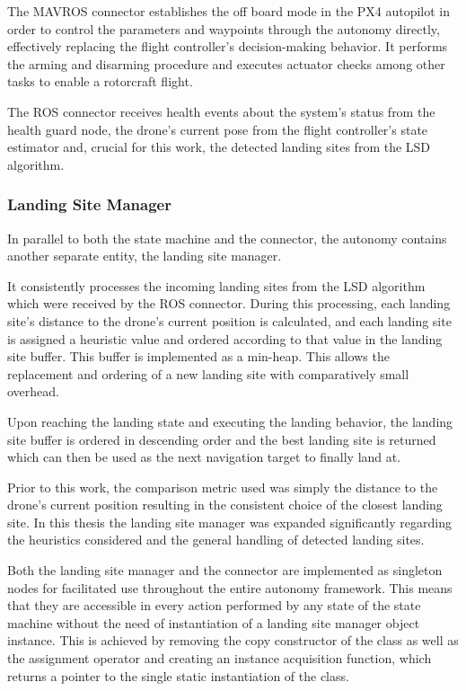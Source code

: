 The MAVROS connector establishes the off board mode in the PX4 autopilot in order to control the parameters and waypoints through the autonomy directly, effectively replacing the flight controller's decision-making behavior. It performs the arming and disarming procedure and executes actuator checks among other tasks to enable a rotorcraft flight.

The ROS connector receives health events about the system's status from the health guard node, the drone's current pose from the flight controller's state estimator and, crucial for this work, the detected landing sites from the LSD algorithm.

\subsubsection{Landing Site Manager}

In parallel to both the state machine and the connector, the autonomy contains another separate entity, the landing site manager. 

It consistently processes the incoming landing sites from the LSD algorithm which were received by the ROS connector. During this processing, each landing site's distance to the drone's current position is calculated, and each landing site is assigned a heuristic value and ordered according to that value in the landing site buffer. This buffer is implemented as a min-heap. This allows the replacement and ordering of a new landing site with comparatively small overhead. 

Upon reaching the landing state and executing the landing behavior, the landing site buffer is ordered in descending order and the best landing site is returned which can then be used as the next navigation target to finally land at.

Prior to this work, the comparison metric used was simply the distance to the drone's current position resulting in the consistent choice of the closest landing site. In this thesis the landing site manager was expanded significantly regarding the heuristics considered and the general handling of detected landing sites. 

Both the landing site manager and the connector are implemented as singleton nodes for facilitated use throughout the entire autonomy framework. This means that they are accessible in every action performed by any state of the state machine without the need of instantiation of a landing site manager object instance. This is achieved by removing the copy constructor of the class as well as the assignment operator and creating an instance acquisition function, which returns a pointer to the single static instantiation of the class.

